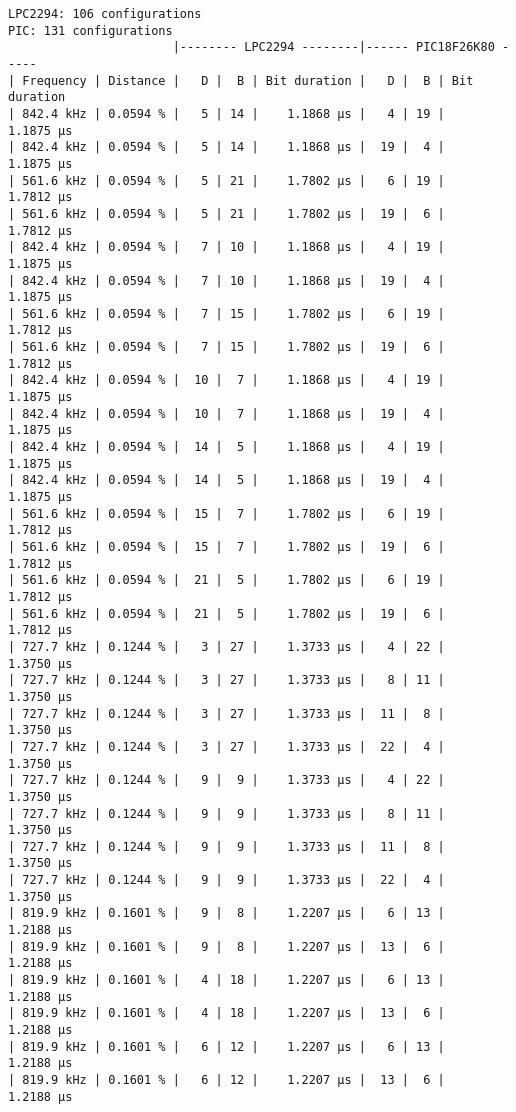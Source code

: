 {\footnotesize\singlespacing
\begin{verbatim}
LPC2294: 106 configurations
PIC: 131 configurations
                       |-------- LPC2294 --------|------ PIC18F26K80 -----
| Frequency | Distance |   D |  B | Bit duration |   D |  B | Bit duration
| 842.4 kHz | 0.0594 % |   5 | 14 |    1.1868 µs |   4 | 19 |    1.1875 µs 
| 842.4 kHz | 0.0594 % |   5 | 14 |    1.1868 µs |  19 |  4 |    1.1875 µs 
| 561.6 kHz | 0.0594 % |   5 | 21 |    1.7802 µs |   6 | 19 |    1.7812 µs 
| 561.6 kHz | 0.0594 % |   5 | 21 |    1.7802 µs |  19 |  6 |    1.7812 µs 
| 842.4 kHz | 0.0594 % |   7 | 10 |    1.1868 µs |   4 | 19 |    1.1875 µs 
| 842.4 kHz | 0.0594 % |   7 | 10 |    1.1868 µs |  19 |  4 |    1.1875 µs 
| 561.6 kHz | 0.0594 % |   7 | 15 |    1.7802 µs |   6 | 19 |    1.7812 µs 
| 561.6 kHz | 0.0594 % |   7 | 15 |    1.7802 µs |  19 |  6 |    1.7812 µs 
| 842.4 kHz | 0.0594 % |  10 |  7 |    1.1868 µs |   4 | 19 |    1.1875 µs 
| 842.4 kHz | 0.0594 % |  10 |  7 |    1.1868 µs |  19 |  4 |    1.1875 µs 
| 842.4 kHz | 0.0594 % |  14 |  5 |    1.1868 µs |   4 | 19 |    1.1875 µs 
| 842.4 kHz | 0.0594 % |  14 |  5 |    1.1868 µs |  19 |  4 |    1.1875 µs 
| 561.6 kHz | 0.0594 % |  15 |  7 |    1.7802 µs |   6 | 19 |    1.7812 µs 
| 561.6 kHz | 0.0594 % |  15 |  7 |    1.7802 µs |  19 |  6 |    1.7812 µs 
| 561.6 kHz | 0.0594 % |  21 |  5 |    1.7802 µs |   6 | 19 |    1.7812 µs 
| 561.6 kHz | 0.0594 % |  21 |  5 |    1.7802 µs |  19 |  6 |    1.7812 µs 
| 727.7 kHz | 0.1244 % |   3 | 27 |    1.3733 µs |   4 | 22 |    1.3750 µs 
| 727.7 kHz | 0.1244 % |   3 | 27 |    1.3733 µs |   8 | 11 |    1.3750 µs 
| 727.7 kHz | 0.1244 % |   3 | 27 |    1.3733 µs |  11 |  8 |    1.3750 µs 
| 727.7 kHz | 0.1244 % |   3 | 27 |    1.3733 µs |  22 |  4 |    1.3750 µs 
| 727.7 kHz | 0.1244 % |   9 |  9 |    1.3733 µs |   4 | 22 |    1.3750 µs 
| 727.7 kHz | 0.1244 % |   9 |  9 |    1.3733 µs |   8 | 11 |    1.3750 µs 
| 727.7 kHz | 0.1244 % |   9 |  9 |    1.3733 µs |  11 |  8 |    1.3750 µs 
| 727.7 kHz | 0.1244 % |   9 |  9 |    1.3733 µs |  22 |  4 |    1.3750 µs 
| 819.9 kHz | 0.1601 % |   9 |  8 |    1.2207 µs |   6 | 13 |    1.2188 µs 
| 819.9 kHz | 0.1601 % |   9 |  8 |    1.2207 µs |  13 |  6 |    1.2188 µs 
| 819.9 kHz | 0.1601 % |   4 | 18 |    1.2207 µs |   6 | 13 |    1.2188 µs 
| 819.9 kHz | 0.1601 % |   4 | 18 |    1.2207 µs |  13 |  6 |    1.2188 µs 
| 819.9 kHz | 0.1601 % |   6 | 12 |    1.2207 µs |   6 | 13 |    1.2188 µs 
| 819.9 kHz | 0.1601 % |   6 | 12 |    1.2207 µs |  13 |  6 |    1.2188 µs 
\end{verbatim}
}

